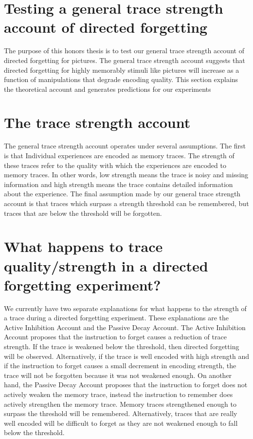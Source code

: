 \documentclass[
  english,
  man,floatsintext]{apa6}
\begin{document}
\hypertarget{testing-a-general-trace-strength-account-of-directed-forgetting}{%
\section{Testing a general trace strength account of directed forgetting}\label{testing-a-general-trace-strength-account-of-directed-forgetting}}

The purpose of this honors thesis is to test our general trace strength account of directed forgetting for pictures. The general trace strength account suggests that directed forgetting for highly memorably stimuli like pictures will increase as a function of manipulations that degrade encoding quality. This section explains the theoretical account and generates predictions for our experiments

\hypertarget{the-trace-strength-account}{%
\section{The trace strength account}\label{the-trace-strength-account}}

The general trace strength account operates under several assumptions. The first is that Individual experiences are encoded as memory traces. The strength of these traces refer to the quality with which the experiences are encoded to memory traces. In other words, low strength means the trace is noisy and missing information and high strength means the trace contains detailed information about the experience. The final assumption made by our general trace strength account is that traces which surpass a strength threshold can be remembered, but traces that are below the threshold will be forgotten.

\hypertarget{what-happens-to-trace-qualitystrength-in-a-directed-forgetting-experiment}{%
\section{What happens to trace quality/strength in a directed forgetting experiment?}\label{what-happens-to-trace-qualitystrength-in-a-directed-forgetting-experiment}}

We currently have two separate explanations for what happens to the strength of a trace during a directed forgetting experiment. These explanations are the Active Inhibition Account and the Passive Decay Account. The Active Inhibition Account proposes that the instruction to forget causes a reduction of trace strength. If the trace is weakened below the threshold, then directed forgetting will be observed. Alternatively, if the trace is well encoded with high strength and if the instruction to forget causes a small decrement in encoding strength, the trace will not be forgotten because it was not weakened enough. On another hand, the Passive Decay Account proposes that the instruction to forget does not actively weaken the memory trace, instead the instruction to remember does actively strengthen the memory trace. Memory traces strengthened enough to surpass the threshold will be remembered. Alternatively, traces that are really well encoded will be difficult to forget as they are not weakened enough to fall below the threshold.
\end{document}
